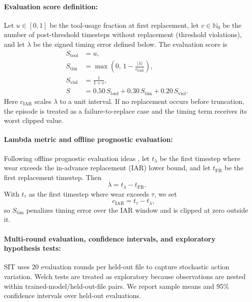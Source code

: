 \documentclass[sn-basic]{sn-jnl}%
\begin{document}
\paragraph{Evaluation score definition:}
Let $u\in[0,1]$ be the tool-usage fraction at first replacement, let $v\in\mathbb{N}_0$ be the number of post-threshold timesteps without replacement (threshold violations), and let $\lambda$ be the signed timing error defined below. The evaluation score is
\begin{align}
	S_{\text{tool}} &= u,\\
	S_{\text{tim}} &= \max\left(0,\,1-\frac{|\lambda|}{c_{\mathrm{IAR}}}\right),\\
	S_{\text{viol}} &= \frac{1}{1+v},\\
	S &= 0.50\,S_{\text{tool}} + 0.30\,S_{\text{tim}} + 0.20\,S_{\text{viol}}.
\end{align}
Here $c_{\mathrm{IAR}}$ scales $\lambda$ to a unit interval. If no replacement occurs before truncation, the episode is treated as a failure-to-replace case and the timing term receives its worst clipped value.

\paragraph{Lambda metric and offline prognostic evaluation:}
Following offline prognostic evaluation ideas \cite{Saxena2010Metrics}, let $t_{\lambda}$ be the first timestep where wear exceeds the in-advance replacement (IAR) lower bound, and let $t_{\mathrm{FR}}$ be the first replacement timestep. Then
\begin{equation}
		\lambda = t_{\lambda} - t_{\mathrm{FR}}.
\end{equation}
With $t_{\tau}$ as the first timestep where wear exceeds $\tau$, we set
\begin{equation}
\qquad c_{\mathrm{IAR}} = t_{\tau}-t_{\lambda},
\end{equation}
so $S_{\text{tim}}$ penalizes timing error over the IAR window and is clipped at zero outside it.

\paragraph{Multi-round evaluation, confidence intervals, and exploratory hypothesis tests:}
SIT uses 20 evaluation rounds per held-out file to capture stochastic action variation. Welch tests are treated as exploratory because observations are nested within trained-model/held-out-file pairs. We report sample means and 95\% confidence intervals over held-out evaluations.
\end{document}
